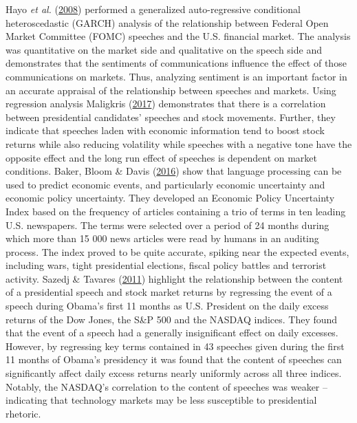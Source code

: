 \documentclass[11pt,preprint, authoryear]{elsarticle}
\numberwithin{equation}{section}
\numberwithin{figure}{section}
\numberwithin{table}{section}
\begin{document}
Hayo \emph{et al.} (\protect\hyperlink{ref-hayo2008communicating}{2008})
performed a generalized auto-regressive conditional heteroscedastic
(GARCH) analysis of the relationship between Federal Open Market
Committee (FOMC) speeches and the U.S. financial market. The analysis
was quantitative on the market side and qualitative on the speech side
and demonstrates that the sentiments of communications influence the
effect of those communications on markets. Thus, analyzing sentiment is
an important factor in an accurate appraisal of the relationship between
speeches and markets. Using regression analysis Maligkris
(\protect\hyperlink{ref-maligkris2017political}{2017}) demonstrates that
there is a correlation between presidential candidates' speeches and
stock movements. Further, they indicate that speeches laden with
economic information tend to boost stock returns while also reducing
volatility while speeches with a negative tone have the opposite effect
and the long run effect of speeches is dependent on market conditions.
Baker, Bloom \& Davis (\protect\hyperlink{ref-baker2016measuring}{2016})
show that language processing can be used to predict economic events,
and particularly economic uncertainty and economic policy uncertainty.
They developed an Economic Policy Uncertainty Index based on the
frequency of articles containing a trio of terms in ten leading U.S.
newspapers. The terms were selected over a period of 24 months during
which more than 15 000 news articles were read by humans in an auditing
process. The index proved to be quite accurate, spiking near the
expected events, including wars, tight presidential elections, fiscal
policy battles and terrorist activity. Sazedj \& Tavares
(\protect\hyperlink{ref-sazedj2011hope}{2011}) highlight the
relationship between the content of a presidential speech and stock
market returns by regressing the event of a speech during Obama's first
11 months as U.S. President on the daily excess returns of the Dow
Jones, the S\&P 500 and the NASDAQ indices. They found that the event of
a speech had a generally insignificant effect on daily excesses.
However, by regressing key terms contained in 43 speeches given during
the first 11 months of Obama's presidency it was found that the content
of speeches can significantly affect daily excess returns nearly
uniformly across all three indices. Notably, the NASDAQ's correlation to
the content of speeches was weaker -- indicating that technology markets
may be less susceptible to presidential rhetoric.
\end{document}
